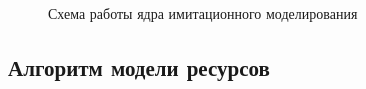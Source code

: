 \begin{figure}[H]
    \caption{Схема работы ядра имитационного моделирования}
    \label{ris:IM_blockShema}
\end{figure}


\subsection{Алгоритм модели ресурсов}
\label{resource}

